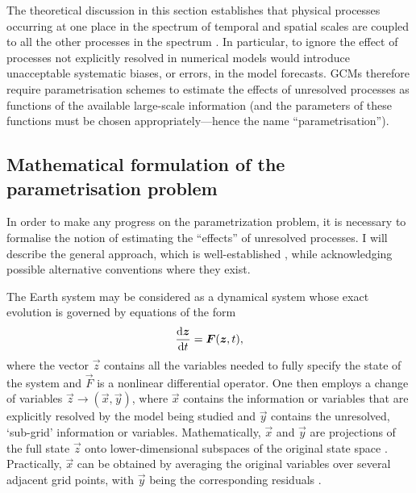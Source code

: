 \documentclass[../main.tex]{subfiles}
\begin{document}
The theoretical discussion in this section establishes that physical processes
occurring at one place in the spectrum of temporal and spatial scales are
coupled to all the other processes in the spectrum \parencite{franzke2015}. In
particular, to ignore the effect of processes not explicitly resolved in
numerical models would introduce unacceptable systematic biases, or errors, in
the model forecasts. GCMs therefore require parametrisation schemes to estimate
the effects of unresolved processes as functions of the available large-scale
information (and the parameters of these functions must be chosen
appropriately---hence the name ``parametrisation'').


\subsection{Mathematical formulation of the parametrisation problem}%
\label{sec:math}
In order to make any progress on the parametrization problem, it is necessary
to formalise the notion of estimating the ``effects'' of unresolved processes.
I will describe the general approach, which is well-established \parencite[see,
e.g.,][]{hasselmann1976,palmer2001,demaeyer2018,brajard2021}, while
acknowledging possible alternative conventions where they exist.

The Earth system may be considered as a dynamical system whose exact evolution
is governed by equations of the form
\begin{equation} \label{eqn:truth}
    \frac{\mathrm{d} \bm{z}}{\mathrm{d} t} = \bm{F}(\bm{z},t),
\end{equation}
where the vector $\vec{z}$ contains all the variables needed to fully specify
the state of the system and $\vec{F}$ is a nonlinear differential operator. One
then employs a change of variables $\vec{z} \to (\vec{x},\vec{y})$, where
$\vec{x}$ contains the information or variables that are explicitly resolved by
the model being studied and $\vec{y}$ contains the unresolved, `sub-grid'
information or variables. Mathematically, $\vec{x}$ and $\vec{y}$ are
projections of the full state $\vec{z}$ onto lower-dimensional subspaces of the
original state space \parencite{brajard2021}. Practically, $\vec{x}$ can be
obtained by averaging the original variables over several adjacent grid points,
with $\vec{y}$ being the corresponding residuals
\parencite{zacharuk2018,alcala2021}. 
\end{document}
